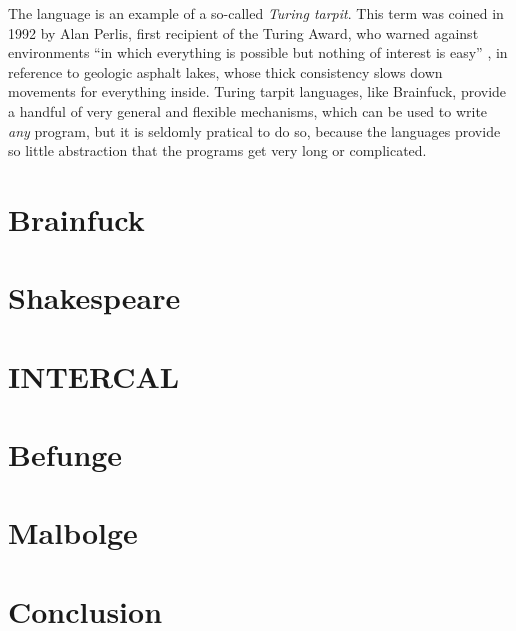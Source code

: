 \documentclass{sig-alternate}
\begin{document}
The language is an example of a so-called \emph{Turing tarpit}. This term was coined in 1992 by Alan Perlis, first recipient of the Turing Award, who warned against environments “in which everything is possible but nothing of interest is easy” \cite{perlis1982epigrams}, in reference to geologic asphalt lakes, whose thick consistency slows down movements for everything inside. Turing tarpit languages, like Brainfuck, provide a handful of very general and flexible mechanisms, which can be used to write \emph{any} program, but it is seldomly pratical to do so, because the languages provide so little abstraction that the programs get very long or complicated.

\newpage
\section{Brainfuck}



\newpage
\section{Shakespeare}



\newpage
\section{INTERCAL}



\newpage
\section{Befunge}



\newpage
\section{Malbolge}



\newpage

\section{Conclusion}

\blindtext[5]

\printbibliography
\end{document}
